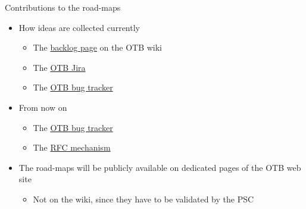 \documentclass[8pt]{beamer}
\begin{document}
\begin{frame}[label=sec-9]{Contributions to the road-maps}
\begin{itemize}
\item How ideas are collected currently
\begin{itemize}
\item The \href{http://wiki.orfeo-toolbox.org/index.php/OTB_Backlog}{backlog page} on the OTB wiki
\item The \href{http://scrum.orfeo-toolbox.org/}{OTB Jira}
\item The \href{https://bugs.orfeo-toolbox.org/my_view_page.php}{OTB bug tracker}
\end{itemize}
\item From now on
\begin{itemize}
\item The \href{https://bugs.orfeo-toolbox.org/my_view_page.php}{OTB bug tracker}
\item The \href{http://wiki.orfeo-toolbox.org/index.php/Project_Steering_Committee#Requests_for_changes}{RFC mechanism}
\end{itemize}
\item The road-maps will be publicly available on dedicated pages of the
OTB web site
\begin{itemize}
\item Not on the wiki, since they have to be validated by the PSC
\end{itemize}
\end{itemize}
\end{frame}
\end{document}
